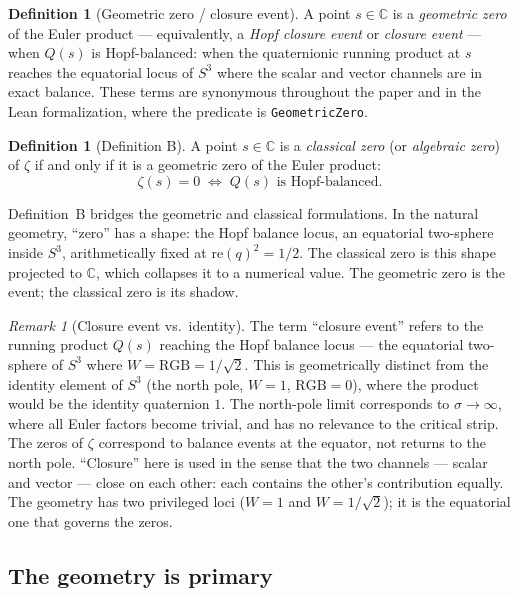 \documentclass[12pt,a4paper]{article}
\theoremstyle{definition}
\newtheorem{definition}[theorem]{Definition}
\theoremstyle{remark}
\newtheorem{remark}[theorem]{Remark}
\begin{document}
\begin{definition}[Geometric zero / closure event]\label{def:geom_zero}
A point $s \in \mathbb{C}$ is a \emph{geometric zero} of the Euler product ---
equivalently, a \emph{Hopf closure event} or \emph{closure event} --- when
$Q(s)$ is Hopf-balanced: when the quaternionic running product at $s$ reaches
the equatorial locus of $S^3$ where the scalar and vector channels are in
exact balance. These terms are synonymous throughout the paper and in the Lean
formalization, where the predicate is \texttt{GeometricZero}.
\end{definition}

\begin{definition}[Definition B]\label{def:B}
A point $s \in \mathbb{C}$ is a \emph{classical zero} (or \emph{algebraic
zero}) of $\zeta$ if and only if it is a geometric zero of the Euler product:
\[
  \zeta(s) = 0 \;\iff\; Q(s) \text{ is Hopf-balanced}.
\]
\end{definition}

Definition~B bridges the geometric and classical formulations. In the natural
geometry, ``zero'' has a shape: the Hopf balance locus, an equatorial two-sphere
inside $S^3$, arithmetically fixed at $\mathrm{re}(q)^2 = 1/2$. The classical
zero is this shape projected to $\mathbb{C}$, which collapses it to a numerical
value. The geometric zero is the event; the classical zero is its shadow.

\begin{remark}[Closure event vs.\ identity]\label{rem:closure}
The term ``closure event'' refers to the running product $Q(s)$ reaching the
Hopf balance locus --- the equatorial two-sphere of $S^3$ where $W =
\mathrm{RGB} = 1/\sqrt{2}$. This is geometrically distinct from the identity
element of $S^3$ (the north pole, $W = 1$, $\mathrm{RGB} = 0$), where the
product would be the identity quaternion $1$. The north-pole limit corresponds
to $\sigma \to \infty$, where all Euler factors become trivial, and has no
relevance to the critical strip. The zeros of $\zeta$ correspond to balance
events at the equator, not returns to the north pole. ``Closure'' here is used
in the sense that the two channels --- scalar and vector --- close on each
other: each contains the other's contribution equally. The geometry has two
privileged loci ($W=1$ and $W=1/\sqrt{2}$); it is the equatorial one that
governs the zeros.
\end{remark}

\subsection{The geometry is primary}
\end{document}
